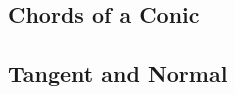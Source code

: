 \documentclass[journal,12pt,onecolumn]{IEEEtran}
\begin{document}
\subsection{ Chords of a Conic}

\subsection{ Tangent and Normal}

%

%
%
%
\end{document}

